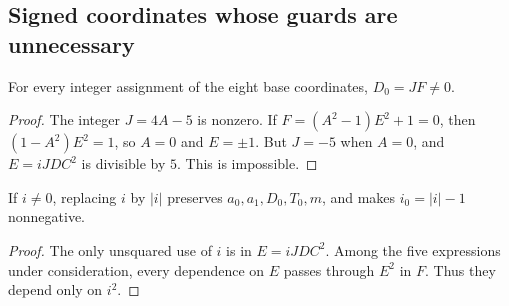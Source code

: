 \subsection{Signed coordinates whose guards are unnecessary}

\begin{lemma}\label{lem:s16-denominator}
For every integer assignment of the eight base coordinates,
\(D_0=JF\neq0\).
\end{lemma}
\begin{proof}
The integer \(J=4A-5\) is nonzero.  If
\(F=(A^2-1)E^2+1=0\), then
\((1-A^2)E^2=1\), so \(A=0\) and \(E=\pm1\).
But \(J=-5\) when \(A=0\), and \(E=iJDC^2\) is divisible by \(5\).
This is impossible.
\end{proof}

\begin{lemma}\label{lem:s16-isign}
If \(i\neq0\), replacing \(i\) by \(|i|\) preserves
\(a_0,a_1,D_0,T_0,m\), and makes \(i_0=|i|-1\) nonnegative.
\end{lemma}
\begin{proof}
The only unsquared use of \(i\) is in \(E=iJDC^2\).
Among the five expressions under consideration, every dependence on
\(E\) passes through \(E^2\) in \(F\).  Thus they depend only on \(i^2\).
\end{proof}

